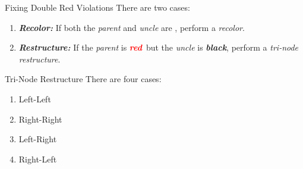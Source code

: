 \documentclass[aspectratio=169]{beamer}
\newcommand{\textib}[1]{\textit{\textbf{{#1}}}}
\newcommand{\red}{\textib{\textcolor{red}{red}}}
\begin{document}
\begin{frame}[fragile]{Fixing Double Red Violations}
    There are two cases:
    \begin{enumerate}[label=\textit{(\roman*)}]
        \item<0> \textib{Recolor:} If both the \textit{parent} and \textit{uncle} are
            \textib{\color{red}{red}}, perform a \textit{recolor}.
        \item \textib{Restructure:} If the \textit{parent} is \red \ but the
            \textit{uncle} is \textib{black}, perform a \textit{tri-node restructure}.
    \end{enumerate}
\end{frame}
\begin{frame}{Tri-Node Restructure}
    There are four cases:
    \begin{enumerate}[label=\textit{(\roman*)}]
        \item Left-Left
        \item Right-Right
        \item Left-Right
        \item Right-Left
    \end{enumerate}
\end{frame}


\end{document}
